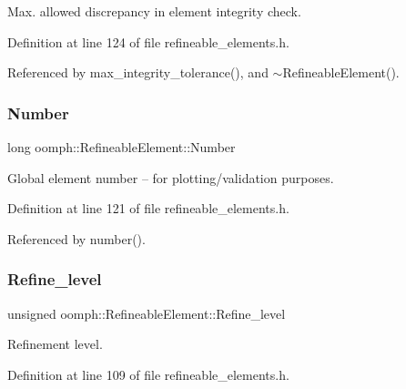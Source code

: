 Max. allowed discrepancy in element integrity check. 



Definition at line 124 of file refineable\+\_\+elements.\+h.



Referenced by max\+\_\+integrity\+\_\+tolerance(), and $\sim$\+Refineable\+Element().

\mbox{\label{classoomph_1_1RefineableElement_a8ad33274f3d7a65f8a633b9d9fa36a1d}} 
\subsubsection{\texorpdfstring{Number}{Number}}
{\footnotesize\ttfamily long oomph\+::\+Refineable\+Element\+::\+Number\hspace{0.3cm}{\ttfamily [protected]}}



Global element number -- for plotting/validation purposes. 



Definition at line 121 of file refineable\+\_\+elements.\+h.



Referenced by number().

\mbox{\label{classoomph_1_1RefineableElement_a6ef0a3da577993977af94a37b48c4846}} 
\subsubsection{\texorpdfstring{Refine\+\_\+level}{Refine\_level}}
{\footnotesize\ttfamily unsigned oomph\+::\+Refineable\+Element\+::\+Refine\+\_\+level\hspace{0.3cm}{\ttfamily [protected]}}



Refinement level. 



Definition at line 109 of file refineable\+\_\+elements.\+h.



